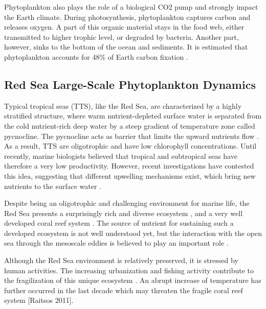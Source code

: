 Phytoplankton also plays the role of a biological CO2 pump and strongly impact the Earth climate. During photosynthesis, phytoplankton captures carbon and releases oxygen. A part of this organic material stays in the food web, either transmitted to higher trophic level, or degraded  by bacteria. Another part, however, sinks to the bottom of the ocean and sediments. It is estimated that phytoplankton accounts for 48\% of Earth carbon fixation \cite{Pal2014}.

\subsection{Red Sea Large-Scale Phytoplankton Dynamics}

Typical tropical seas (TTS), like the Red Sea, are characterized by a highly stratified structure, where warm nutrient-depleted surface water is separated from the cold nutrient-rich deep water by a steep gradient of temperature zone called pycnocline. The pycnocline acts as barrier that limits the upward nutrients flow \cite{Mann2006}. As a result, TTS are oligotrophic and have low chlorophyll concentrations. Until recently, marine biologists believed that tropical and subtropical seas have therefore a very low productivity. However, recent investigations have contested this idea, suggesting that different upwelling mechanisms exist, which bring new nutrients to the surface water \cite{Mann2006}.

Despite being an oligotrophic and challenging environment for marine life, the Red Sea presents a surprisingly rich and diverse ecosystem \cite{Raitsos2011}, and a very well developed coral reef system \cite{Racault}. The source of nutrient for sustaining such a developed ecosystem is not well understood yet, but the interaction with the open sea through the mesoscale eddies is believed to play an important role \cite{Raitsos2013, Zhan2014}.

Although the Red Sea environment is relatively preserved, it is stressed by human activities. The increasing urbanization and fishing activity contribute to the fragilization of this unique ecosystem \cite{Acker2008}. An abrupt increase of temperature has further occurred in the last decade which may threaten the fragile coral reef system [Raitsos 2011].

